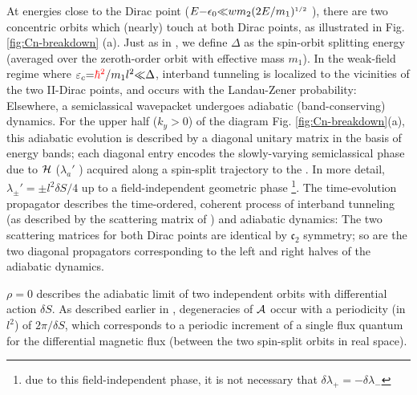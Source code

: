 \documentclass[aps, prb, showpacs, twocolumn, notitlepage, superscriptaddress]{revtex4-1}
\begin{document}

At energies close to the Dirac point ($E{-}\epsilon_0 {\ll} wm_2(2E/m_1)^{\scriptscriptstyle{1/2}}$ ), there are two concentric orbits which (nearly) touch at both Dirac points, as illustrated in Fig. \ref{fig:Cn-breakdown} (a). Just as in , we define $\Delta$ as the spin-orbit splitting energy (averaged over the zeroth-order orbit with effective mass $m_1$). In the weak-field regime where $\varepsilon_c{=}\textcolor{red}{\hbar^2}/m_1l^2{\ll}\Delta$, interband tunneling is localized to the vicinities of the two II-Dirac points, and occurs with the Landau-Zener probability:
Elsewhere, a semiclassical wavepacket undergoes adiabatic (band-conserving) dynamics. For the upper half ($k_y>0$) of the diagram Fig. \ref{fig:Cn-breakdown}(a), this adiabatic evolution is described by a diagonal unitary matrix in the basis of energy bands; each diagonal entry encodes the slowly-varying semiclassical phase due to $\mathcal{H}$ ($\lambda_a'$ ) acquired along a spin-split trajectory to the . In more detail, $\lambda_{\pm}'{=}{\pm}l^2\delta S/4$ up to a field-independent geometric phase \footnote{due to this field-independent phase, it is not necessary that $\delta\lambda_+=-\delta\lambda_-$}.  
The time-evolution propagator  describes the time-ordered, coherent process of interband tunneling (as described by the scattering matrix of )
 and adiabatic dynamics:
The two scattering matrices for both Dirac points are identical by $\mathfrak{c}_2$ symmetry; so are the two diagonal propagators corresponding to the left and right halves of the adiabatic dynamics. 

$\rho{=}0$  describes the adiabatic limit of two independent orbits with differential action $\delta S$. As described earlier in , degeneracies of ${\cal A}$ occur with a periodicity (in $l^2$) of $2\pi/\delta S$, which corresponds to a periodic increment of a single flux quantum for  the differential magnetic flux (between the two spin-split orbits in real space). 
\end{document}
